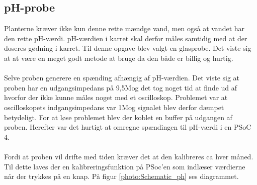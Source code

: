 \subsection{pH-probe}
Planterne kræver ikke kun denne rette mændge vand, men også at vandet har den rette pH-værdi. pH-værdien i karret skal derfor måles samtidig med at der doseres gødning i karret. Til denne opgave blev valgt en glasprobe. Det viste sig at at være en meget godt metode at bruge da den både er billig og hurtig.
\\\\
Selve proben generere en spænding afhængig af pH-værdien. Det viste sig at proben har en udgangsimpedans på 9,5M\ohm og det tog noget tid at finde ud af hvorfor der ikke kunne måles noget med et oscilloskop. Problemet var at oscilloskopets indgangsimpedans var 1M\ohm og signalet blev derfor dæmpet betydeligt. For at løse problemet blev der koblet en buffer på udgangen af proben. Herefter var det hurtigt at omregne spændingen til pH-værdi i en PSoC 4. 
\\\\
Fordi at proben vil drifte med tiden kræver det at den kalibreres ca hver måned. Til dette laves der en kalibreringsfunktion på PSoc'en som indlæser værdierne når der trykkes på en knap. På figur \ref{photo:Schematic_ph} ses diagrammet.


